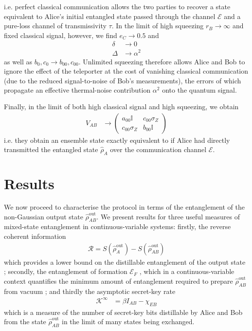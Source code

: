 \documentclass[%
 reprint,
 superscriptaddress,
 amsmath,
 amssymb,
 aps,
 pra,
]{revtex4-2}
\newcommand{\id}{\mathbb{I}}
\newcommand{\sz}{\sigma_Z}
\begin{document}
i.e. perfect classical communication allows the two parties to recover a state equivalent to Alice's initial entangled state passed through the channel $\mathcal{E}$ and a pure-loss channel of transmissivity $\tau$. In the limit of high squeezing $r_B \longrightarrow \infty$ and fixed classical signal, however, we find $e_C \longrightarrow 0.5$ and
\begin{align}
    \delta &\longrightarrow 0 \\
    \Delta &\longrightarrow \alpha^2
\end{align}
as well as $b_{0}, c_0 \longrightarrow b_{00}, c_{00}$. Unlimited squeezing therefore allows Alice and Bob to ignore the effect of the teleporter at the cost of vanishing classical communication (due to the reduced signal-to-noise of Bob's measurements), the errors of which propagate an effective thermal-noise contribution $\alpha^2$ onto the quantum signal.

Finally, in the limit of both high classical signal and high squeezing, we obtain
\begin{align}
    V_{AB} &\longrightarrow \begin{pmatrix}
        a_{00} \id & c_{00} \sz \\
        c_{00} \sz & b_{00} \id
    \end{pmatrix}
\end{align}
i.e. they obtain an ensemble state exactly equivalent to if Alice had directly transmitted the entangled state $\hat \rho_A$ over the communication channel $\mathcal{E}$.

\section{Results} \label{sec:results}
We now proceed to characterise the protocol in terms of the entanglement of the non-Gaussian output state $\hat \rho_{AB}^\mathrm{out}$. We present results for three useful measures of mixed-state entanglement in continuous-variable systems: firstly, the reverse coherent information \cite{garcia-patron_reverse_2009}
\begin{align}
    \mathcal{R} = S(\hat \rho_A^\mathrm{out}) - S(\hat \rho_{AB}^\mathrm{out})
\end{align}
which provides a lower bound on the distillable entanglement of the output state \cite{weedbrook_gaussian_2012, winnel_generalized_2020, pirandola_advances_2020}; secondly, the entanglement of formation $\mathcal{E}_F$ \cite{bennett_mixed-state_1996, wolf_gaussian_2004}, which in a continuous-variable context quantifies the minimum amount of entanglement required to prepare $\hat \rho_{AB}^\mathrm{out}$ from vacuum \cite{wolf_extremality_2006, tserkis_quantifying_2017, tserkis_quantifying_2019}; and thirdly the asymptotic secret-key rate \cite{devetak_distillation_2005, laudenbach_continuousvariable_2018}
\begin{align}
    \mathcal{K}^\infty &= \beta I_{AB} - \chi_{EB}
\end{align}
which is a measure of the number of secret-key bits distillable by Alice and Bob from the state $\hat \rho_{AB}^\mathrm{out}$ in the limit of many states being exchanged.
\end{document}
